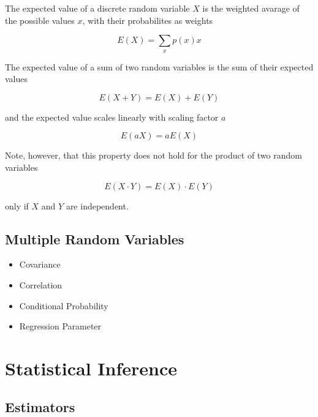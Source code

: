 \documentclass[
]{book}
\providecommand{\tightlist}{%
  \setlength{\itemsep}{0pt}\setlength{\parskip}{0pt}}
\theoremstyle{definition}
\theoremstyle{definition}
\theoremstyle{definition}
\theoremstyle{remark}
\begin{document}
The expected value of a discrete random variable \(X\) is the weighted avarage of the possible values \(x\), with their probabilites as weights

\begin{equation}
E(X) = \sum_{x} p(x) x
\end{equation}

The expected value of a sum of two random variables is the sum of their expected values

\begin{equation}
E(X + Y) = E(X) + E(Y)
\end{equation}

and the expected value scales linearly with scaling factor \(a\)

\begin{equation}
E(a X) = a E(X)
\end{equation}

Note, however, that this property does not hold for the product of two random variables

\begin{equation}
E(X \cdot Y) = E(X) \cdot E(Y)
\end{equation}

only if \(X\) and \(Y\) are independent.

\hypertarget{multiple-random-variables}{%
\subsection{Multiple Random Variables}\label{multiple-random-variables}}

\begin{itemize}
\tightlist
\item
  Covariance
\item
  Correlation
\item
  Conditional Probability
\item
  Regression Parameter
\end{itemize}

\hypertarget{statistical-inference}{%
\section{Statistical Inference}\label{statistical-inference}}

\hypertarget{estimators}{%
\subsection{Estimators}\label{estimators}}
\end{document}
